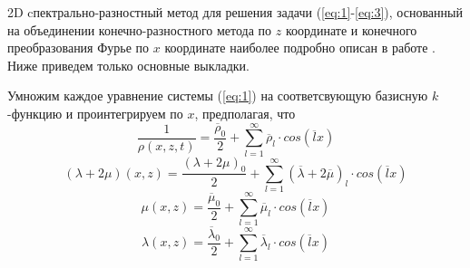 2D cпектрально-разностный метод для решения задачи (\ref{eq:1}-\ref{eq:3}), основанный на объединении
конечно-разностного метода по $z$ координате и конечного преобразования Фурье по $x$ координате
наиболее подробно описан в работе \cite{mart}. Ниже приведем только основные выкладки.

Умножим каждое уравнение системы (\ref{eq:1}) на соответсвующую базисную $k$-функцию и проинтегрируем
по $x$, предполагая, что
$$
\frac{1}{\rho(x,z,t)} = \frac{\overline{\rho}_0}{2} + \sum_{l=1}^\infty{\overline{\rho}_{l} \cdot cos(\overline lx)}
$$
$$
(\lambda + 2 \mu)(x,z) = \frac{(\lambda + 2 \mu)_0}{2} + \sum_{l=1}^\infty{(\overline{\lambda} + 2 \overline{\mu})_{l} \cdot cos(\overline lx)}
$$
$$
\mu(x,z) = \frac{\overline{\mu}_0}{2} + \sum_{l=1}^\infty{\overline{\mu}_l \cdot cos(\overline lx)}
$$
$$
\lambda(x,z) = \frac{\overline{\lambda}_0}{2} + \sum_{l=1}^\infty{\overline{\lambda}_l \cdot cos(\overline lx)}
$$

